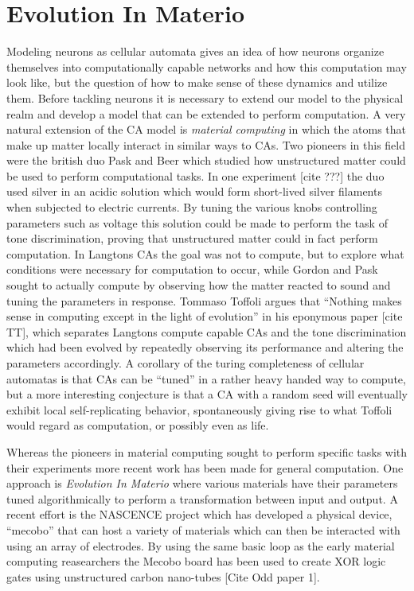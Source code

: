 \section{Evolution In Materio}
Modeling neurons as cellular automata gives an idea of how neurons organize
themselves into computationally capable networks and how this computation may
look like, but the question of how to make sense of these dynamics and utilize
them.
Before tackling neurons it is necessary to extend our model to the physical
realm and develop a model that can be extended to perform computation.
A very natural extension of the CA model is \emph{material computing} in which
the atoms that make up matter locally interact in similar ways to CAs.
%
Two pioneers in this field were the british duo Pask and Beer which studied how
unstructured matter could be used to perform computational tasks.
%
In one experiment [cite ???] the duo used silver in an acidic solution which
would form short-lived silver filaments when subjected to electric currents.
%
By tuning the various knobs controlling parameters such as voltage this solution
could be made to perform the task of tone discrimination, proving that
unstructured matter could in fact perform computation.
%
In Langtons CAs the goal was not to compute, but to explore what conditions were
necessary for computation to occur, while Gordon and Pask sought to actually
compute by observing how the matter reacted to sound and tuning the parameters
in response.
%
Tommaso Toffoli argues that ``Nothing makes sense in computing except in the
light of evolution'' in his eponymous paper [cite TT], which separates Langtons
compute capable CAs and the tone discrimination which had been evolved by
repeatedly observing its performance and altering the parameters accordingly.
%
A corollary of the turing completeness of cellular automatas is that CAs can be
``tuned'' in a rather heavy handed way to compute, but a more interesting
conjecture is that a CA with a random seed will eventually exhibit local
self-replicating behavior, spontaneously giving rise to what Toffoli would
regard as computation, or possibly even as life.\par
%
Whereas the pioneers in material computing sought to perform specific tasks with
their experiments more recent work has been made for general computation.
One approach is \emph{Evolution In Materio} where various materials have their
parameters tuned algorithmically to perform a transformation between input and
output.
A recent effort is the NASCENCE project which has developed a physical device,
``mecobo'' that can host a variety of materials which can then be interacted
with using an array of electrodes.
By using the same basic loop as the early material computing reasearchers the
Mecobo board has been used to create XOR logic gates using unstructured carbon
nano-tubes [Cite Odd paper 1].
%

